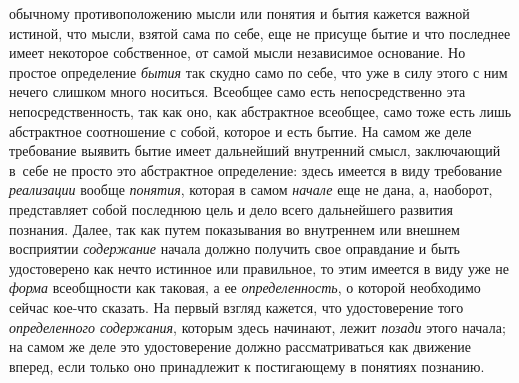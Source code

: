 обычному противоположению мысли или понятия и бытия кажется важной истиной,
что мысли, взятой сама по себе, еще не присуще бытие и что последнее имеет
некоторое собственное, от самой мысли независимое основание. Но простое
определение {\em бытия}
так скудно само по себе, что уже в силу этого с ним нечего
слишком много носиться. Всеобщее само есть непосредственно эта
непосредственность, так как оно, как абстрактное всеобщее, само тоже есть
лишь абстрактное соотношение с собой, которое и есть бытие. На самом же
деле требование выявить бытие имеет дальнейший внутренний
смысл, заключающий в~себе не просто это абстрактное определение: здесь
имеется в виду требование {\em реализации} вообще
{\em понятия}, которая в самом {\em начале} еще не
дана, а, наоборот, представляет собой последнюю цель и дело всего
дальнейшего развития познания. Далее, так как путем показывания во
внутреннем или внешнем восприятии {\em содержание} начала
должно получить свое оправдание и быть удостоверено как нечто истинное или
правильное, то этим имеется в виду уже не
{\em форма} всеобщности
как таковая, а ее {\em определенность},
о которой необходимо сейчас кое-что сказать. На первый взгляд
кажется, что удостоверение того {\em определенного содержания},
которым здесь начинают, лежит {\em позади} этого начала;
на самом же деле это удостоверение должно рассматриваться как движение
вперед, если только оно принадлежит к постигающему в понятиях познанию.

